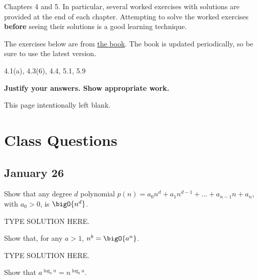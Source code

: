 \documentclass[final]{article}
\begin{document}
\begin{titlepage}
    \begin{tcolorbox}[title=Reading,fonttitle=\bfseries]
        Chapters 4 and 5. In particular, several worked exercises with solutions are provided at the end of each chapter. Attempting to solve the worked exercises \textbf{before} seeing their solutions is a good learning technique.
    \end{tcolorbox}
    The exercises below are from \href{https://sites.google.com/site/gopalpandurangan/home/algorithms-course}{the book}. The book is updated periodically, so be sure to use the latest version.

    \begin{tcolorbox}[title=Exercises,fonttitle=\bfseries]
        4.1(a), 4.3(6), 4.4,  5.1, 5.9
    \end{tcolorbox}

    \textbf{Justify your answers. Show appropriate work.}
\end{titlepage}
\vspace*{\fill}\begin{center}{\Huge This page intentionally left blank.}\end{center}\vspace*{\fill}\thispagestyle{empty}\clearpage
{}

\section{Class Questions}
\subsection{January 26}

\begin{question}
    Show that any degree $d$ polynomial $p(n) = a_0n^d + a_1n^{d - 1} + \dots + a_{n-1}n + a_n$, with $a_0 > 0$, is $\bigO{n^d}$.
\end{question}

\begin{solution}
    TYPE SOLUTION HERE.
\end{solution}

\begin{question}
    Show that, for any $a > 1$, $n^b = \bigO{a^n}$.
\end{question}

\begin{solution}
    TYPE SOLUTION HERE.
\end{solution}

\begin{question}
    Show that $a^{\log_b{n}} = n^{\log_b{a}}$.
\end{question}
\end{document}
